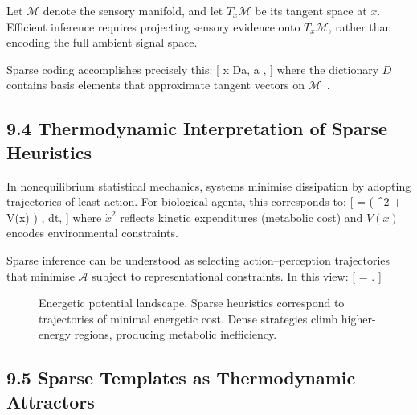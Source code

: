\documentclass[11pt,a4paper,twoside]{article}
\begin{document}
Let $\mathcal{M}$ denote the sensory manifold, and let $T_x\mathcal{M}$ be its tangent space at $x$. Efficient inference requires projecting sensory evidence onto $T_x\mathcal{M}$, rather than encoding the full ambient signal space.

Sparse coding accomplishes precisely this:
[
x \approx Da, \qquad a ,
]
where the dictionary $D$ contains basis elements that approximate tangent vectors on $\mathcal{M}$~\cite{olshausen1996emergence,mairal2010online}.

\subsection{9.4 Thermodynamic Interpretation of Sparse Heuristics}

In nonequilibrium statistical mechanics, systems minimise dissipation by adopting trajectories of least action. For biological agents, this corresponds to:
[
  = \int \left( ^2 + V(x) \right) , dt,
]
where $\dot{x}^2$ reflects kinetic expenditures (metabolic cost) and $V(x)$ encodes environmental constraints.

Sparse inference can be understood as selecting action--perception trajectories that minimise $\mathcal{A}$ subject to representational constraints. In this view:
[
 = .
]

\begin{figure}[h]
\centering
{}
\caption{Energetic potential landscape. Sparse heuristics correspond to trajectories of minimal energetic cost. Dense strategies climb higher-energy regions, producing metabolic inefficiency.}
\end{figure}

\subsection{9.5 Sparse Templates as Thermodynamic Attractors}
\end{document}
